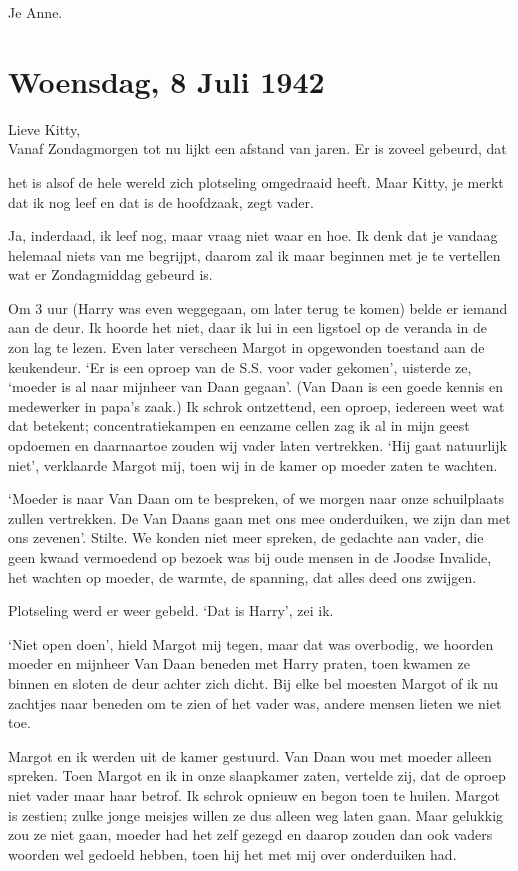 \documentclass{book}
\begin{document}
Je Anne.

\chapter{Woensdag, 8 Juli 1942}

Lieve Kitty,\\Vanaf Zondagmorgen tot nu lijkt een afstand van jaren. Er
is zoveel gebeurd, dat

het is alsof de hele wereld zich plotseling omgedraaid heeft. Maar
Kitty, je merkt dat ik nog leef en dat is de hoofdzaak, zegt vader.

Ja, inderdaad, ik leef nog, maar vraag niet waar en hoe. Ik denk dat je
vandaag helemaal niets van me begrijpt, daarom zal ik maar beginnen met
je te vertellen wat er Zondagmiddag gebeurd is.

Om 3 uur (Harry was even weggegaan, om later terug te komen) belde er
iemand aan de deur. Ik hoorde het niet, daar ik lui in een ligstoel op
de veranda in de zon lag te lezen. Even later verscheen Margot in
opgewonden toestand aan de keukendeur. `Er is een oproep van de S.S.
voor vader gekomen', uisterde ze, `moeder is al naar mijnheer van Daan
gegaan'. (Van Daan is een goede kennis en medewerker in papa's zaak.) Ik
schrok ontzettend, een oproep, iedereen weet wat dat betekent;
concentratiekampen en eenzame cellen zag ik al in mijn geest opdoemen en
daarnaartoe zouden wij vader laten vertrekken. `Hij gaat natuurlijk
niet', verklaarde Margot mij, toen wij in de kamer op moeder zaten te
wachten.

`Moeder is naar Van Daan om te bespreken, of we morgen naar onze
schuilplaats zullen vertrekken. De Van Daans gaan met ons mee
onderduiken, we zijn dan met ons zevenen'. Stilte. We konden niet meer
spreken, de gedachte aan vader, die geen kwaad vermoedend op bezoek was
bij oude mensen in de Joodse Invalide, het wachten op moeder, de warmte,
de spanning, dat alles deed ons zwijgen.

Plotseling werd er weer gebeld. `Dat is Harry', zei ik.

`Niet open doen', hield Margot mij tegen, maar dat was overbodig, we
hoorden moeder en mijnheer Van Daan beneden met Harry praten, toen
kwamen ze binnen en sloten de deur achter zich dicht. Bij elke bel
moesten Margot of ik nu zachtjes naar beneden om te zien of het vader
was, andere mensen lieten we niet toe.

Margot en ik werden uit de kamer gestuurd. Van Daan wou met moeder
alleen spreken. Toen Margot en ik in onze slaapkamer zaten, vertelde
zij, dat de oproep niet vader maar haar betrof. Ik schrok opnieuw en
begon toen te huilen. Margot is zestien; zulke jonge meisjes willen ze
dus alleen weg laten gaan. Maar gelukkig zou ze niet gaan, moeder had
het zelf gezegd en daarop zouden dan ook vaders woorden wel gedoeld
hebben, toen hij het met mij over onderduiken had.
\end{document}
